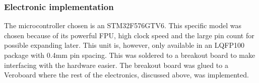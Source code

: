 \subsubsection{Electronic implementation}

The microcontroller chosen is an STM32F576GTV6. This specific model was chosen because of its powerful FPU, high clock speed and the large pin count for possible expanding later. This unit is, however, only available in an LQFP100 package with 0.4mm pin spacing. This was soldered to a breakout board to make interfacing with the hardware easier. The breakout board was glued to a Veroboard where the rest of the electronics, discussed above, was implemented.